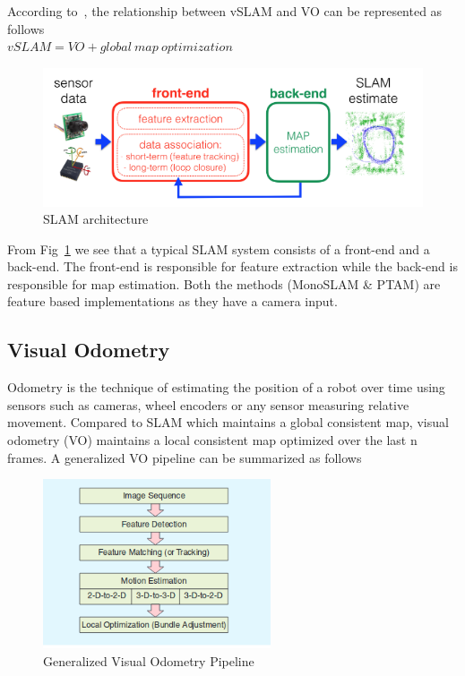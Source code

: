 According to~\cite{scaramuzza2011visual}, the relationship between vSLAM and VO can be represented as follows\\

$vSLAM = VO + global\ map\ optimization$\\


\begin{figure}
  \includegraphics[width=\textwidth]{./figures/slam_model.png}
\caption{SLAM architecture~\cite{cadena2016past}}
\label{fig:slammodel}       %
\end{figure}

From Fig~\ref{fig:slammodel} we see that a typical SLAM system consists of a front-end and a back-end. The front-end is responsible for feature extraction while the back-end is responsible for map estimation. Both the methods (MonoSLAM \& PTAM) are feature based implementations as they have a camera input. 

\subsection{Visual Odometry}

Odometry is the technique of estimating the position of a robot over time using sensors such as cameras,  wheel encoders or any sensor measuring relative movement. Compared to SLAM which maintains a global consistent map, visual odometry (VO) maintains a local consistent map optimized over the last n frames. A generalized VO pipeline can be summarized as follows

\begin{figure}[!htb]
  \includegraphics[width=\textwidth,height=5cm,keepaspectratio]{./figures/vo.png}
\caption{Generalized Visual Odometry Pipeline~\cite{scaramuzza2011visual}}
\label{fig:vo}       %
\end{figure}

